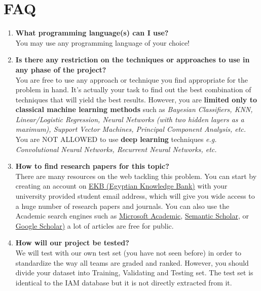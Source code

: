 \documentclass[12pt]{article}
\begin{document}
\newpage
\section{FAQ}

\begin{enumerate}
    \item \textbf{What programming language(s) can I use?}
    \\
    You may use any programming language of your choice!
    
    \item \textbf{Is there any restriction on the techniques or approaches to use in any phase of the project?}
    \\
    You are free to use any approach or technique you find appropriate for the problem in hand. It’s actually your task to find out the best combination of techniques that will yield the best results. However, you are \textbf{limited only to classical machine learning methods} such as \textit{Bayesian Classifiers, KNN, Linear/Logistic Regression, Neural Networks (with two hidden layers as a maximum), Support Vector Machines, Principal Component Analysis, etc.} 
    \\
    You are NOT ALLOWED to use \textbf{deep learning} techniques \textit{e.g.} \textit{Convolutional Neural Networks, Recurrent Neural Networks, etc.}
    
    \item \textbf{How to find research papers for this topic?}
    \\
    There are many resources on the web tackling this problem. You can start by creating an account on \href{https://www.ekb.eg/}{\color{blue}EKB (Egyptian Knowledge Bank)} with your university provided student email address, which will give you wide access to a huge number of research papers and journals. You can also use the Academic search engines such as \href{https://academic.microsoft.com/}{\color{blue} Microsoft Academic}, \href{https://www.semanticscholar.org/me/research}{\color{blue}  Semantic Scholar}, or \href{https://scholar.google.com/}{\color{blue}Google Scholar)} a lot of articles are free for public.
    
    \item \textbf{How will our project be tested?}
    \\
    We will test with our own test set (you have not seen before) in order to standardize the way all teams are graded and ranked. However, you should divide your dataset into Training, Validating and Testing set. The test set is identical to the IAM database but it is not directly extracted from it. 
    

\end{enumerate}
\end{document}

